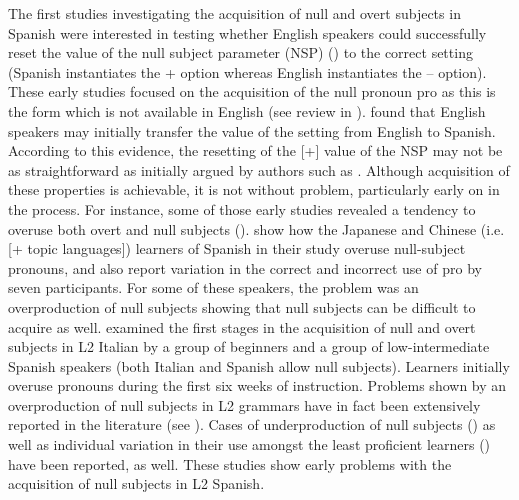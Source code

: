 \documentclass[output=paper]{langscibook}
\begin{document}
The first studies investigating the acquisition of null and overt subjects in Spanish were interested in testing whether English speakers could successfully reset the value of the null subject parameter (NSP) (\citealt{Chomsky1981,Jaeggli1982,JaeggliSafir1989,Rizzi1982,Rizzi1986}) to the correct setting (Spanish instantiates the + option whereas English instantiates the $–$ option). These early studies focused on the acquisition of the null pronoun pro as this is the form which is not available in English (see review in \citealt{Dominguez2013}). \citet{Al-KaseyPérez-Leroux1998} found that English speakers may initially transfer the value of the setting from English to Spanish. According to this evidence, the resetting of the [+] value of the NSP may not be as straightforward as initially argued by authors such as \citet{Phinney1987}. Although acquisition of these properties is achievable, it is not without problem, particularly early on in the process.  For instance, some of those early studies revealed a tendency to overuse both overt and null subjects (\citealt{AlmogueraLagunas1993,DiazLiceras1990}). \citet{LicerasDíaz1999} show how the Japanese and Chinese (i.e. [+ topic languages]) learners of Spanish in their study overuse null-subject pronouns, and \citet{AlmogueraLagunas1993} also report variation in the correct and incorrect use of pro by seven participants. For some of these speakers, the problem was an overproduction of null subjects showing that null subjects can be difficult to acquire as well. \citet{Bini1993} examined the first stages in the acquisition of null and overt subjects in L2 Italian by a group of beginners and a group of low-intermediate Spanish speakers (both Italian and Spanish allow null subjects). Learners initially overuse pronouns during the first six weeks of instruction. Problems shown by an overproduction of null subjects in L2 grammars have in fact been extensively reported in the literature (see \citealt{DiazLiceras1990,LicerasEtAl1999,Perez-LerouxGlass1999,LaFondEtAl2001, MontrulRodríguezLouro2006,RothmanIverson2007, LubbersBlackwell2009}). Cases of underproduction of null subjects (\citealt{Lozano2009}) as well as individual variation in their use amongst the least proficient learners (\citealt{LicerasDíaz1999,RothmanIverson2007}) have been reported, as well. These studies show early problems with the acquisition of null subjects in L2 Spanish.
\end{document}
